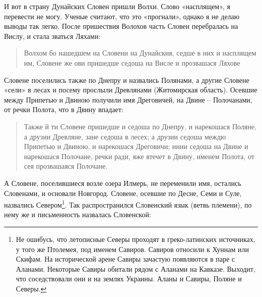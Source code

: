 И вот в страну Дунайских Словен пришли Волхи. Слово «насплящем», я перевести не могу. Ученые считают, что это «прогнали», однако я не делаю выводы так легко. После пришествия Волохов часть Словен перебралась на Вислу, и стала зваться Ляхами:


\begin{quotation}
Волхом бо нашедшем на Словени на Дунайския, седше в них и насплящем им, Словене же ови пришедше седоша на Висле и прозвашася Ляхове
\end{quotation}


Словене поселились также по Днепру и назвались Полянами, а другие Словене «сели» в лесах и посему прослыли Древлянами (Житомирская область). Осевшие между Припетью и Двиною получили имя Дреговичей, на Двине – Полочанами, от речки Полота, что в Двину впадает:

\begin{quotation}
Также й ти Словене пришедше и седоша по Днепру, и нарекошася Поляне, а друзии Древляне, зане седоша в лесех; а друзии седоша междю Припетью и Двиною, и нарекошася Дреговичи; инии седоша на Двине и нарекошася Полочане, речки ради, яже втечет в Двину, именем Полота, от сея прозвашаяся Полочане. 
\end{quotation}

А Словене, поселившиеся возле озера Илмерь, не переменили имя, остались Словенами, и основали Новгород. Словене, осевшие по Десне, Семи и Суле, назвались Севером\footnote{Не ошибусь, что летописные Северы проходят в греко-латинских источниках, у того же Птолемея, под именем Савиров. Савиров относили к Хуннам или Скифам. На исторической арене Савиры зачастую появляются в паре с Аланами. Некоторые Савиры обитали рядом с Аланами на Кавказе. Выходит, что соседствовали они и на землях Украины. Аланы и Савиры, Поляне и Северы.}. Так распространился Словенский язык (ветвь племени), по нему же и письменность назвалась Словенской:

